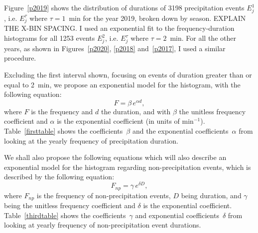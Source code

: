 \documentclass[11pt]{report}
\begin{document}
Figure~\ref{p2019} shows the distribution of durations of 3198
precipitation events $E_j^1$, i.e. $E_j^\tau$ where $\tau=1$~min for
the year 2019, broken down by season. EXPLAIN THE X-BIN SPACING. 
I used an exponential fit to the
frequency-duration histograms for all 1253 events $E_j^2$,
i.e. $E_j^\tau$ where $\tau=2$~min. For all the other years, as shown
in Figures~\ref{p2020}, \ref{p2018} and~\ref{p2017}, I used a similar
procedure.

Excluding the first interval shown, focusing on events of duration
greater than or equal to 2~min, we propose an exponential model for
the histogram, with the following equation:
\begin{equation}\label{expod}
  F = \beta \,e^{\alpha d},
\end{equation}
where $F$ is the frequency and $d$ the duration, and with $\beta$ the
unitless frequency coefficient and $\alpha$ is the exponential
coefficient (in units of min$^{-1}$). Table~\ref{firsttable} shows the
coefficients~$\beta$ and the exponential coefficients~$\alpha$ from
looking at the yearly frequency of precipitation duration.

We shall also propose the following equations which will also describe an exponential model for the histogram regarding non-precipitation events, which is described by the following equation: 
\begin{equation}\label{expod_np}
	F_{np} = \gamma \,e^{\delta D},
\end{equation}
where $F_{np}$ is the frequency of non-precipitation events, $D$ being duration, and $\gamma $ being the unitless frequency coefficient and $\delta $ is the exponential coefficient. Table~\ref{thirdtable} shows the coefficients~$\gamma$ and exponential coefficients~$\delta$ from looking at yearly frequency of non-precipitation event durations. 
\end{document}
